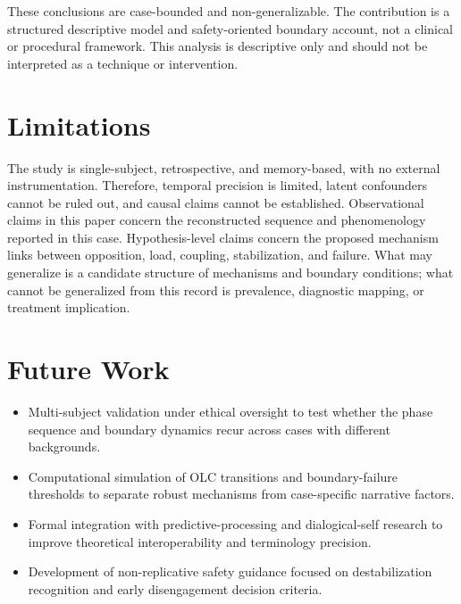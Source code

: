 \documentclass[11pt]{article}
\begin{document}
These conclusions are case-bounded and non-generalizable. The contribution is a structured descriptive model and safety-oriented boundary account, not a clinical or procedural framework.
This analysis is descriptive only and should not be interpreted as a technique or intervention.

\section{Limitations}
The study is single-subject, retrospective, and memory-based, with no external instrumentation. Therefore, temporal precision is limited, latent confounders cannot be ruled out, and causal claims cannot be established. Observational claims in this paper concern the reconstructed sequence and phenomenology reported in this case. Hypothesis-level claims concern the proposed mechanism links between opposition, load, coupling, stabilization, and failure. What may generalize is a candidate structure of mechanisms and boundary conditions; what cannot be generalized from this record is prevalence, diagnostic mapping, or treatment implication.

\section{Future Work}
\begin{itemize}[leftmargin=*]
  \item Multi-subject validation under ethical oversight to test whether the phase sequence and boundary dynamics recur across cases with different backgrounds.
  \item Computational simulation of OLC transitions and boundary-failure thresholds to separate robust mechanisms from case-specific narrative factors.
  \item Formal integration with predictive-processing and dialogical-self research to improve theoretical interoperability and terminology precision.
  \item Development of non-replicative safety guidance focused on destabilization recognition and early disengagement decision criteria.
\end{itemize}



\end{document}
